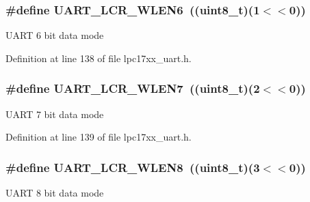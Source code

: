 \subsubsection[{\texorpdfstring{U\+A\+R\+T\+\_\+\+L\+C\+R\+\_\+\+W\+L\+E\+N6}{UART_LCR_WLEN6}}]{\setlength{\rightskip}{0pt plus 5cm}\#define U\+A\+R\+T\+\_\+\+L\+C\+R\+\_\+\+W\+L\+E\+N6~(({\bf uint8\+\_\+t})(1$<$$<$0))}\hypertarget{group___u_a_r_t___private___macros_ga916fcefe6db8651be1cb1c066726381d}{}\label{group___u_a_r_t___private___macros_ga916fcefe6db8651be1cb1c066726381d}
U\+A\+RT 6 bit data mode 

Definition at line 138 of file lpc17xx\+\_\+uart.\+h.

\subsubsection[{\texorpdfstring{U\+A\+R\+T\+\_\+\+L\+C\+R\+\_\+\+W\+L\+E\+N7}{UART_LCR_WLEN7}}]{\setlength{\rightskip}{0pt plus 5cm}\#define U\+A\+R\+T\+\_\+\+L\+C\+R\+\_\+\+W\+L\+E\+N7~(({\bf uint8\+\_\+t})(2$<$$<$0))}\hypertarget{group___u_a_r_t___private___macros_ga7746eb5a2aac4b9f86e97ee82e5e2a10}{}\label{group___u_a_r_t___private___macros_ga7746eb5a2aac4b9f86e97ee82e5e2a10}
U\+A\+RT 7 bit data mode 

Definition at line 139 of file lpc17xx\+\_\+uart.\+h.

\subsubsection[{\texorpdfstring{U\+A\+R\+T\+\_\+\+L\+C\+R\+\_\+\+W\+L\+E\+N8}{UART_LCR_WLEN8}}]{\setlength{\rightskip}{0pt plus 5cm}\#define U\+A\+R\+T\+\_\+\+L\+C\+R\+\_\+\+W\+L\+E\+N8~(({\bf uint8\+\_\+t})(3$<$$<$0))}\hypertarget{group___u_a_r_t___private___macros_ga71ecde192fb0c9facb9ef9c6b77cc687}{}\label{group___u_a_r_t___private___macros_ga71ecde192fb0c9facb9ef9c6b77cc687}
U\+A\+RT 8 bit data mode 

